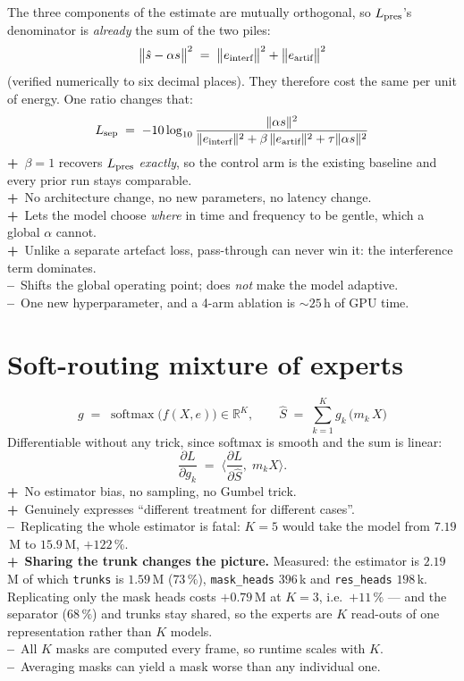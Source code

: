 \documentclass[11pt,a4paper]{article}
\newcommand{\pro}{\textbf{\textsf{+}}~}
\newcommand{\con}{\textbf{\textsf{--}}~}
\begin{document}
The three components of the estimate are mutually orthogonal, so
$L_\textup{pres}$'s denominator is \emph{already} the sum of the two piles:
\[
\big\lVert \hat{s} - \alpha s \big\rVert^2
  \;=\; \big\lVert e_\textup{interf} \big\rVert^2
      + \big\lVert e_\textup{artif} \big\rVert^2
\]
(verified numerically to six decimal places). They therefore cost the same per
unit of energy. One ratio changes that:
\[
L_\textup{sep} \;=\; -10\log_{10}
  \frac{\lVert \alpha s\rVert^2}
       {\lVert e_\textup{interf}\rVert^2
        + \beta\,\lVert e_\textup{artif}\rVert^2
        + \tau\lVert \alpha s\rVert^2}
\]
\pro $\beta=1$ recovers $L_\textup{pres}$ \emph{exactly}, so the control arm is
the existing baseline and every prior run stays comparable.\\
\pro No architecture change, no new parameters, no latency change.\\
\pro Lets the model choose \emph{where} in time and frequency to be gentle, which
a global $\alpha$ cannot.\\
\pro Unlike a separate artefact loss, pass-through can never win it: the
interference term dominates.\\
\con Shifts the global operating point; does \emph{not} make the model adaptive.\\
\con One new hyperparameter, and a 4-arm ablation is ${\sim}25$\,h of GPU time.

\section{Soft-routing mixture of experts}
\[
g \;=\; \operatorname{softmax}\!\big(f(X,e)\big) \in \mathbb{R}^K,
\qquad
\hat{S} \;=\; \sum_{k=1}^{K} g_k \,\big(m_k \, X\big)
\]
Differentiable without any trick, since softmax is smooth and the sum is linear:
\[
\frac{\partial L}{\partial g_k}
  \;=\; \Big\langle \frac{\partial L}{\partial \hat{S}},\; m_k X \Big\rangle .
\]
\pro No estimator bias, no sampling, no Gumbel trick.\\
\pro Genuinely expresses ``different treatment for different cases''.\\
\con Replicating the whole estimator is fatal: $K{=}5$ would take the model from
$7.19$\,M to $15.9$\,M, $+122\,\%$.\\
\pro \textbf{Sharing the trunk changes the picture.} Measured: the estimator is
$2.19$\,M of which \texttt{trunks} is $1.59$\,M ($73\,\%$), \texttt{mask\_heads}
$396$\,k and \texttt{res\_heads} $198$\,k. Replicating only the mask heads costs
$+0.79$\,M at $K{=}3$, i.e.\ \textbf{$+11\,\%$} --- and the separator ($68\,\%$)
and trunks stay shared, so the experts are $K$ read-outs of one representation
rather than $K$ models.\\
\con All $K$ masks are computed every frame, so runtime scales with $K$.\\
\con Averaging masks can yield a mask worse than any individual one.
\end{document}
